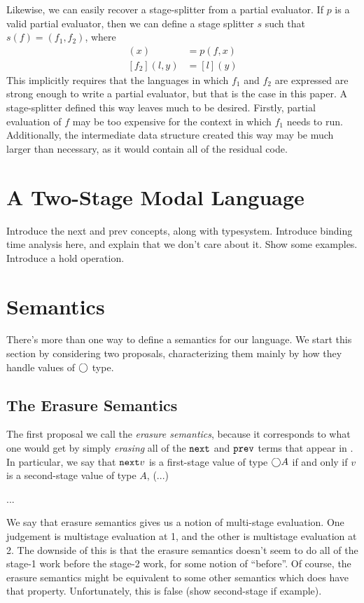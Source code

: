 \documentclass{sigplanconf}
\begin{document}
Likewise, we can easily recover a stage-splitter from a partial evaluator.  If $p$ is a valid partial evaluator, then we can define a stage splitter $s$ such that $s(f)=(f_1,f_2)$, where
\begin{align*}
[f_1](x) &= p (f,x) \\
[f_2](l,y) &= [l] (y)
\end{align*}
This implicitly requires that the languages in which $f_1$ and $f_2$ are expressed are strong enough to write a partial evaluator, but that is the case in this paper.  A stage-splitter defined this way leaves much to be desired.  Firstly, partial evaluation of $f$ may be too expensive for the context in which $f_1$ needs to run.  Additionally, the intermediate data structure created this way may be much larger than necessary, as it would contain all of the residual code.

\section{A Two-Stage Modal Language}

Introduce the next and prev concepts, along with typesystem.  Introduce binding time analysis here, and explain that we don't care about it.  Show some examples.  Introduce a hold operation.

\section{Semantics}

There's more than one way to define a semantics for our language.  We start this section by considering two proposals, characterizing them mainly by how they handle values of $\bigcirc$ type.

\subsection{The Erasure Semantics}

The first proposal we call the {\em erasure semantics}, because it corresponds to what one would get by simply {\em erasing} all of the ${\tt next}$ and ${\tt prev}$ terms that appear in \lamStaged.  In particular, we say that ${\tt next} v$ is a first-stage value of type $\bigcirc A$ if and only if $v$ is a second-stage value of type $A$, (...)

...

We say that erasure semantics gives us a notion of multi-stage evaluation.  One judgement is multistage evaluation at 1, and the other is multistage evaluation at 2.  The downside of this is that the erasure semantics doesn't seem to do all of the stage-1 work before the stage-2 work, for some notion of ``before''.  Of course, the erasure semantics might be equivalent to some other semantics which does have that property.  Unfortunately, this is false (show second-stage if example).
\end{document}
